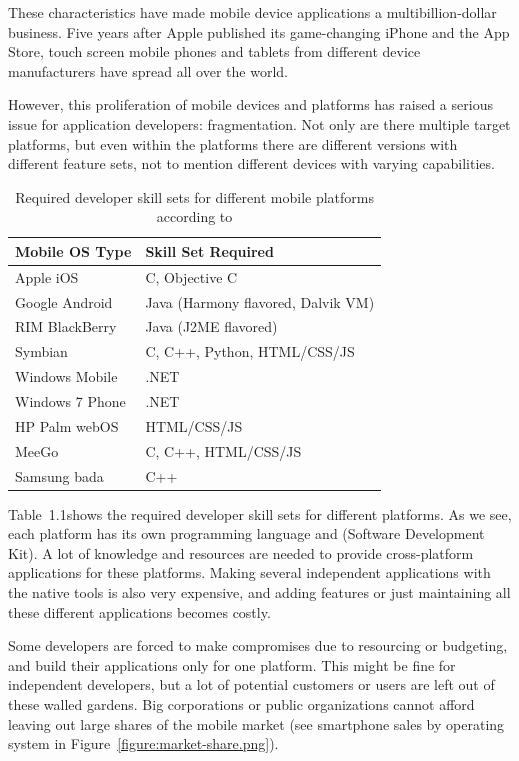 These characteristics have made mobile device applications a
multibillion-dollar business. Five years after Apple published its
game-changing iPhone and the App Store, touch screen mobile phones and
tablets from different device manufacturers have spread all over the
world. \cite{cortimiglia2011mobile, charland2011mobile,
  fling2009mobile}

However, this proliferation of mobile devices and platforms has raised
a serious issue for application developers: fragmentation. Not only
are there multiple target platforms, but even within the platforms
there are different versions with different feature sets, not to
mention different devices with varying
capabilities. \cite{charland2011mobile}

\begin{table}
  \begin{tabular}{ l | l }
    \textbf{Mobile OS Type} & \textbf{Skill Set Required} \\
    \hline
    Apple iOS & C, Objective C \\
    Google Android & Java (Harmony flavored, Dalvik VM) \\
    RIM BlackBerry & Java (J2ME flavored) \\
    Symbian & C, C++, Python, HTML/CSS/JS \\
    Windows Mobile & .NET \\
    Windows 7 Phone & .NET \\
    HP Palm webOS & HTML/CSS/JS \\
    MeeGo & C, C++, HTML/CSS/JS \\
    Samsung bada & C++
  \end{tabular}
  \label{table:native-skills}
  \caption{Required developer skill sets for different mobile
    platforms according to \cite{charland2011mobile}}
\end{table}

Table~1.1\tablerefs shows the required developer skill sets for
different platforms. As we see, each platform has its own programming
language and  (Software Development Kit). A lot of knowledge
and resources are needed to provide cross-platform applications for
these platforms. Making several independent applications with the
native tools is also very expensive, and adding features or just
maintaining all these different applications becomes
costly. \cite{charland2011mobile}

Some developers are forced to make compromises due to resourcing or
budgeting, and build their applications only for one platform. This
might be fine for independent developers, but a lot of potential
customers or users are left out of these walled gardens. Big
corporations or public organizations cannot afford leaving out large
shares of the mobile market (see smartphone sales by operating system
in Figure~\ref{figure:market-share.png}). \cite{berners2010long}

